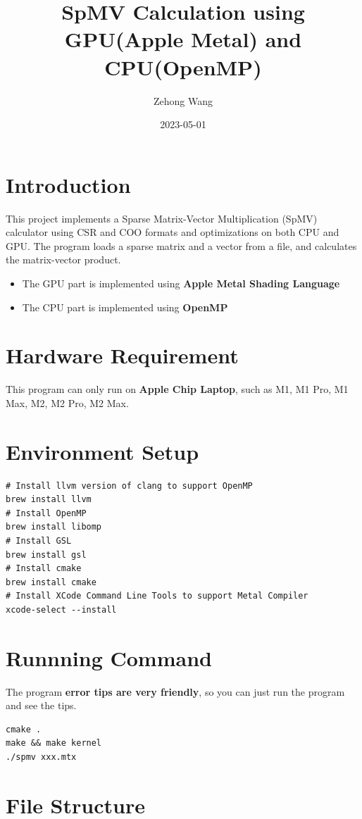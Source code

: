 \documentclass[12pt]{article}
\title{SpMV Calculation using GPU(Apple Metal) and CPU(OpenMP)}
\author{Zehong Wang}
\date{2023-05-01}
\begin{document}
\maketitle

\section{Introduction}
This project implements a Sparse Matrix-Vector Multiplication (SpMV) calculator using CSR and COO formats and optimizations on both CPU and GPU. The program loads a sparse matrix and a vector from a file, and calculates the matrix-vector product.

\begin{itemize}
    \item The GPU part is implemented using \textbf{Apple Metal Shading Language}
    \item The CPU part is implemented using \textbf{OpenMP}
\end{itemize}

\section{Hardware Requirement}
This program can only run on \textbf{Apple Chip Laptop}, such as M1, M1 Pro, M1 Max, M2, M2 Pro, M2 Max.

\section{Environment Setup}
\begin{lstlisting}
# Install llvm version of clang to support OpenMP
brew install llvm
# Install OpenMP
brew install libomp
# Install GSL
brew install gsl
# Install cmake
brew install cmake
# Install XCode Command Line Tools to support Metal Compiler
xcode-select --install
\end{lstlisting}

\section{Runnning Command}
The program \textbf{error tips are very friendly}, so you can just run the program and see the tips.

\begin{lstlisting}
cmake .
make && make kernel
./spmv xxx.mtx
\end{lstlisting}

\section{File Structure}
\end{document}
